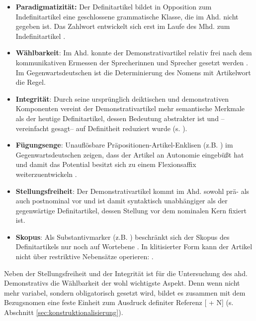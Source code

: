 \begin{itemize}
\item \textbf{Paradigmatizität:} Der Definitartikel bildet in Opposition zum Indefinitartikel eine geschlossene grammatische Klasse, die im Ahd. nicht gegeben ist. Das Zahlwort  entwickelt sich erst im Laufe des Mhd. zum Indefinitartikel \parencite{Szczepaniak2016a}. 
\item \textbf{Wählbarkeit}: Im Ahd. konnte der Demonstrativartikel relativ frei nach dem kommunikativen Ermessen der Sprecherinnen und Sprecher gesetzt werden \parencite{Oubouzar1992}. Im Gegenwartsdeutschen ist die Determinierung des Nomens mit Artikelwort die Regel. 
\item \textbf{Integrität}: Durch seine ursprünglich deiktischen und demonstrativen Komponenten vereint der Demonstrativartikel mehr semantische Merkmale als der heutige Definitartikel, dessen Bedeutung abstrakter ist und -- vereinfacht gesagt-- auf Definitheit reduziert wurde (s. \cite{Lehmann2015}).
\item \textbf{Fügungsenge}: Unauflösbare Präpositionen-Artikel-Enklisen (z.B. ) im Gegenwartsdeutschen zeigen, dass der Artikel an Autonomie eingebüßt hat und damit das Potential besitzt sich zu einem Flexionsaffix weiterzuentwickeln \parencite[s. hierzu][]{Nubling1992,Nubling2005}.  
\item \textbf{Stellungsfreiheit}: Der Demonstrativartikel kommt im Ahd. sowohl prä- als auch postnominal vor \parencite{Schrodt2004} und ist damit syntaktisch unabhängiger als der gegenwärtige Definitartikel, dessen Stellung vor dem nominalen Kern fixiert ist. 
\item \textbf{Skopus}: Als Substantivmarker (z.B. ) beschränkt sich der Skopus des Definitartikels nur noch auf Wortebene \parencite{Szczepaniak2011a}. In klitisierter Form kann der Artikel nicht über restriktive Nebensätze operieren:  \parencite[vgl.][112]{Nubling2005}.
\end{itemize}

\noindent
Neben der Stellungsfreiheit und der Integrität ist für die Untersuchung des ahd. Demonstrativs die Wählbarkeit der wohl wichtigste Aspekt. Denn wenn  nicht mehr variabel, sondern obligatorisch gesetzt wird, bildet es zusammen mit dem Bezugsnomen eine feste Einheit zum Ausdruck definiter Referenz [ + N] (s. Abschnitt \ref{sec:konstruktionalisierung}).   

